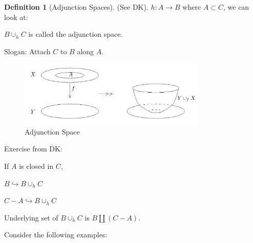 \documentclass{article}
\theoremstyle{definition}
\newtheorem*{definition}{Definition}
\begin{document}
    \begin{definition}
        [Adjunction Spaces] (See DK). \(h: A\to B\) where \(A \subset C\), we can look at:

        \begin{center}
        \end{center}

        \(B\cup_h C\) is called the adjunction space.

        Slogan: Attach \(C\) to \(B\) along \(A\).

        \begin{figure}[H]
            \centering
            \includegraphics[width=0.8\textwidth]{img/adjunction}
            \caption{Adjunction Space}
            \label{fig:Adjunction Space}
        \end{figure}
    \end{definition}

    Exercise from DK:

    If \(A\) is closed in \(C\),

    \(B \hookrightarrow B \cup_h C\) 

    \(C - A \hookrightarrow B \cup_h C\) 

    Underlying set of \(B\cup_h C\) is \(B\coprod (C-A)\).

    Consider the following examples:

    \begin{center}
    \end{center}

    \begin{center}
    \end{center}
\end{document}
